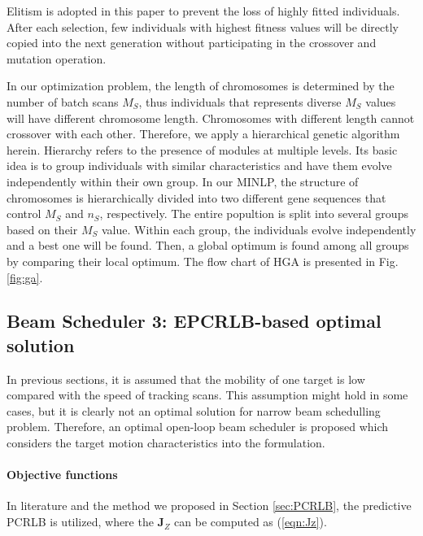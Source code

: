 \documentclass[12pt,journal,draftclsnofoot,onecolumn]{IEEEtran}
\begin{document}
Elitism is adopted in this paper to prevent the loss of highly fitted individuals. After each selection, few individuals with highest fitness values will be directly copied into the next generation without participating in the crossover and mutation operation. 

In our optimization problem, the length of chromosomes is determined by the number of batch scans $M_S$, thus individuals that represents diverse $M_S$ values will have different chromosome length. Chromosomes with different length cannot crossover with each other. Therefore, we apply a hierarchical genetic algorithm herein. Hierarchy refers to the presence of modules at multiple levels. Its basic idea is to group individuals with similar characteristics and have them evolve independently within their own group. In our MINLP, the structure of chromosomes is hierarchically divided into two different gene sequences that control $M_S$ and $n_S$, respectively. The entire popultion is split into several groups based on their $M_S$ value. Within each group, the individuals evolve independently and a best one will be found. Then, a global optimum is found among all groups by comparing their local optimum. The flow chart of HGA is presented in Fig. \ref{fig:ga}. 

\subsection{Beam Scheduler 3: EPCRLB-based optimal solution}
\label{sec:beam3}
In previous sections, it is assumed that the mobility of one target is low compared with the speed of tracking scans. This assumption might hold in some cases, but it is clearly not an optimal solution for narrow beam schedulling problem. Therefore, an optimal open-loop beam scheduler is proposed which considers the target motion characteristics into the formulation.


\paragraph{Objective functions}
In literature \cite{tharmarasa20,punithakumar2006multisensor,hernandez2004multisensor} and the method we proposed in Section \ref{sec:PCRLB}, the predictive {PCRLB} is utilized, where the $\mathbf{J}_Z$ can be computed as (\ref{eqn:Jz}).
\end{document}
